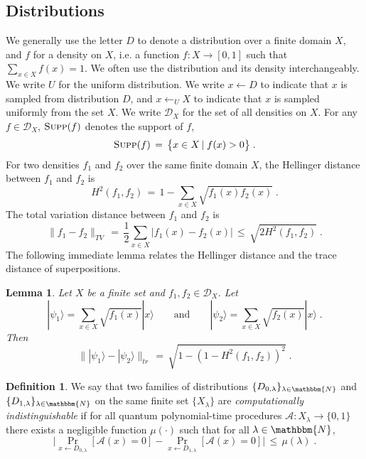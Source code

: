 \documentclass[11pt]{article}
\newtheorem{lemma}[theorem]{Lemma}
\theoremstyle{remark}
\theoremstyle{definition}
\newtheorem{definition}[theorem]{Definition}
\newcommand{\ket}[1]{|#1\rangle}
\newcommand{\supp}{\textsc{Supp}}
\newcommand{\mN}{\mathbbm{N}}
\begin{document}
\subsection{Distributions}

We generally use the letter $D$ to denote a distribution over a finite domain $X$, and $f$ for a density on $X$, i.e. a function $f:X\to[0,1]$ such that $\sum_{x\in X} f(x)=1$. We often use the distribution and its density interchangeably. We write $U$ for the uniform distribution. We write $x\leftarrow D$ to indicate that $x$ is sampled from distribution $D$, and $x\leftarrow_U X$ to indicate that $x$ is sampled uniformly from the set $X$. 
We write $\mathcal{D}_X$ for the set of all densities on $X$.
For any $f\in\mathcal{D}_X$, $\supp(f)$ denotes the support of $f$,
\begin{equation*}
    \supp(f) \,=\, \big\{x\in X \,|\; f(x)> 0\big\}\;.
\end{equation*}
For two densities $f_1$ and $f_2$ over the same finite domain $X$, the Hellinger distance  between $f_1$ and $f_2$ is
\begin{equation}\label{eq:bhatt}
H^2(f_1,f_2) \,=\, 1- \sum_{x\in X}\sqrt{f_1(x)f_2(x)}\;.
\end{equation}
The total variation distance between $f_1$ and $f_2$ is
\begin{equation}\label{eq:stattobhatt}
\|f_1-f_2\|_{TV} \,=\, \frac{1}{2} \sum_{x\in X}|f_1(x) - f_2(x)| \,\leq\, \sqrt{2H^2(f_1,f_2)}\;.
\end{equation}
The following immediate lemma relates the Hellinger distance and the trace distance of superpositions. 
\begin{lemma}
Let $X$ be a finite set and $f_1,f_2\in\mathcal{D}_X$. Let 
$$ \ket{\psi_1}=\sum_{x\in X}\sqrt{f_1(x)}\ket{x}\qquad\text{and}\qquad  \ket{\psi_2}=\sum_{x\in X}\sqrt{f_2(x)}\ket{x}\;.$$
 Then 
 $$\|\ket{\psi_1}-\ket{\psi_2}\|_{tr}\,=\, \sqrt{ 1 - (1-H^2(f_1,f_2))^2}\;.$$
\end{lemma}

\begin{definition}\label{def:compinddist}
We say that two families of distributions $\{D_{0,\lambda}\}_{\lambda\in\mN}$ and $\{D_{1,\lambda}\}_{\lambda\in\mN}$ on the same finite set $\{X_\lambda\}$ are \emph{computationally indistinguishable} if for all quantum polynomial-time procedures $\mathcal{A}:X_\lambda\to\{0,1\}$ there exists a negligible function $\mu(\cdot)$ such that for all $\lambda\in\mN$,
\begin{equation}
\Big|\Pr_{x\leftarrow D_{0,\lambda}}[\mathcal{A}(x) = 0] - \Pr_{x\leftarrow D_{1,\lambda}}[\mathcal{A}(x) = 0]\Big| \,\leq\, \mu(\lambda)\;.
\end{equation}
\end{definition}
\end{document}
